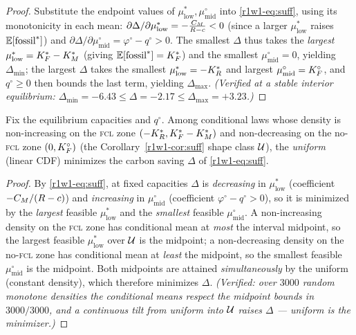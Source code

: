 \begin{proof}
Substitute the endpoint values of $\mu^{*}_{\mathrm{low}},\mu^{\circ}_{\mathrm{mid}}$
into \eqref{r1w1-eq:suff}, using its monotonicity in each mean:
$\partial\Delta/\partial\mu^{*}_{\mathrm{low}}=-\tfrac{C_M}{R-c}<0$ (since a larger
$\mu^{*}_{\mathrm{low}}$ raises $\mathbb{E}[\text{fossil}^{*}]$) and
$\partial\Delta/\partial\mu^{\circ}_{\mathrm{mid}}=\varphi^{\circ}-q^{\circ}>0$. The
smallest $\Delta$ thus takes the \emph{largest} $\mu^{*}_{\mathrm{low}}=K_F^{*}-K_M^{*}$
(giving $\mathbb{E}[\text{fossil}^{*}]=K_F^{*}$) and the smallest $\mu^{\circ}_{\mathrm{mid}}=0$,
yielding $\Delta_{\min}$; the largest $\Delta$ takes the smallest
$\mu^{*}_{\mathrm{low}}=-K_R^{*}$ and largest $\mu^{\circ}_{\mathrm{mid}}=K_F^{\circ}$, and
$q^{\circ}\ge0$ then bounds the last term, yielding $\Delta_{\max}$. \emph{(Verified
at a stable interior equilibrium: $\Delta_{\min}=-6.43\le\Delta=-2.17\le\Delta_{\max}=+3.23$.)}
\end{proof}

\begin{theorem}\label{r1w1-thm:lfd}
Fix the equilibrium capacities and $q^{\circ}$. Among conditional laws whose
density is non-increasing on the \textsc{fcl} zone $(-K_R^{*},K_F^{*}-K_M^{*})$ and
non-decreasing on the no-\textsc{fcl} zone $(0,K_F^{\circ})$ (the
Corollary~\ref{r1w1-cor:suff} shape class $\mathcal U$), the \emph{uniform} (linear CDF)
minimizes the carbon saving $\Delta$ of \eqref{r1w1-eq:suff}.
\end{theorem}

\begin{proof}
By \eqref{r1w1-eq:suff}, at fixed capacities $\Delta$ is \emph{decreasing} in
$\mu^{*}_{\mathrm{low}}$ (coefficient $-C_M/(R-c)$) and \emph{increasing} in
$\mu^{\circ}_{\mathrm{mid}}$ (coefficient $\varphi^{\circ}-q^{\circ}>0$), so it is
minimized by the \emph{largest} feasible $\mu^{*}_{\mathrm{low}}$ and the
\emph{smallest} feasible $\mu^{\circ}_{\mathrm{mid}}$. A non-increasing density on
the \textsc{fcl} zone has conditional mean at \emph{most} the interval midpoint, so
the largest feasible $\mu^{*}_{\mathrm{low}}$ over $\mathcal U$ is the midpoint; a
non-decreasing density on the no-\textsc{fcl} zone has conditional mean at
\emph{least} the midpoint, so the smallest feasible $\mu^{\circ}_{\mathrm{mid}}$ is
the midpoint. Both midpoints are attained \emph{simultaneously} by the uniform
(constant density), which therefore minimizes $\Delta$. \emph{(Verified: over
$3000$ random monotone densities the conditional means respect the midpoint bounds
in $3000/3000$, and a continuous tilt from uniform into $\mathcal U$ raises $\Delta$ ---
uniform is the minimizer.)}
\end{proof}

